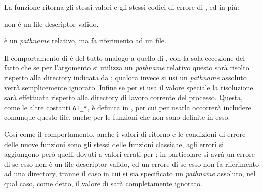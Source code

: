 \begin{funcproto}{
}

{La funzione ritorna gli stessi valori e gli stessi codici di errore di
  , ed in più:
  \begin{errlist}
  \item[\errcode{EBADF}]  non è un file descriptor valido.
  \item[\errcode{ENOTDIR}]  è un \textit{pathname} relativo,
    ma  fa riferimento ad un file.
   \end{errlist}
}  
\end{funcproto}

Il comportamento di  è del tutto analogo a quello di ,
con la sola eccezione del fatto che se per l'argomento  si
utilizza un \textit{pathname} relativo questo sarà risolto rispetto alla
directory indicata da ; qualora invece si usi un
\textit{pathname} assoluto  verrà semplicemente ignorato. Infine
se per  si usa il valore speciale  la
risoluzione sarà effettuata rispetto alla directory di lavoro corrente del
processo. Questa, come le altre costanti \texttt{AT\_*}, è definita in
, per cui per usarla occorrerà includere comunque questo
file, anche per le funzioni che non sono definite in esso.

Così come il comportamento, anche i valori di ritorno e le condizioni di
errore delle nuove funzioni sono gli stessi delle funzioni classiche, agli
errori si aggiungono però quelli dovuti a valori errati per ; in
particolare si avrà un errore di  se esso non è un file
descriptor valido, ed un errore di  se esso non fa
riferimento ad una directory, tranne il caso in cui si sia specificato un
\textit{pathname} assoluto, nel qual caso, come detto, il valore di
 sarà completamente ignorato.

